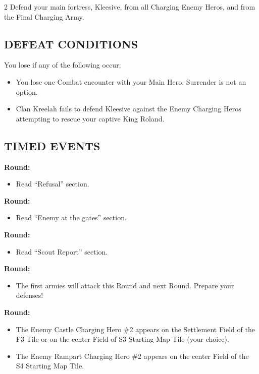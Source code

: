 \begin{multicols}{2}
Defend your main fortress, Kleesive, from all Charging Enemy Heros, and from the Final Charging Army.

\subsection*{\MakeUppercase{Defeat Conditions}}

You lose if any of the following occur:

\begin{itemize}
  \item You lose one Combat encounter with your Main Hero.
    Surrender is not an option.
  \item Clan Kreelah fails to defend Kleesive against the Enemy Charging Heros attempting to rescue your captive King Roland.
\end{itemize}

\subsection*{\MakeUppercase{Timed Events}}

\textbf{ Round:}
\begin{itemize}
  \item Read ``Refusal'' section.
\end{itemize}

\textbf{ Round:}
\begin{itemize}
  \item Read ``Enemy at the gates'' section.
\end{itemize}

\textbf{ Round:}
\begin{itemize}
  \item Read ``Scout Report'' section.
\end{itemize}

\textbf{ Round:}
\begin{itemize}
  \item The first armies will attack this Round and next Round. Prepare your defenses!
\end{itemize}

\textbf{ Round:}
\begin{itemize}
  \item The Enemy Castle Charging Hero \#2 appears on the Settlement Field of the F3 Tile or on the center Field of S3 Starting Map Tile (your choice).
  \item The Enemy Rampart Charging Hero \#2 appears on the center Field of the S4 Starting Map Tile.
\end{itemize}


\end{multicols}

